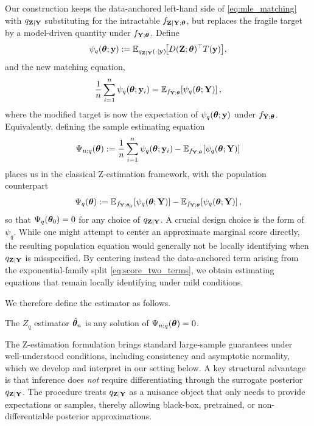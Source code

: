 \documentclass[twoside,11pt]{article}
\begin{document}
Our construction keeps the data-anchored left-hand side of \eqref{eq:mle_matching} with
$q_{{\bf Z}\mid{\bf Y}}$ substituting for the intractable $f_{{\bf Z}\mid{\bf Y};{\bm{\theta}}}$, but replaces the fragile target by a model-driven quantity under $f_{{\bf Y};{\bm{\theta}}}$. Define
\begin{equation}
\psi_q({\bm{\theta}};{\bf y})
:=
\mathbb{E}_{q_{{\bf Z}\mid{\bf Y}}(\cdot\mid {\bf y})}\!\big[D({\bf Z};{\bm{\theta}})^\top T({\bf y})\big]
\label{eq:psi_q},
\end{equation}
%
and the new matching equation, 
%
\begin{equation}
\frac{1}{n}\sum_{i=1}^n \psi_q({\bm{\theta}};{\bf y}_i)
=
\mathbb{E}_{f_{{\bf Y};{\bm{\theta}}}}\!\left[\psi_q({\bm{\theta}};{\bf Y})\right],
\label{eq:zq_matching}
\end{equation}
%
where the modified target is now the expectation of $\psi_q({\bm{\theta}};{\bf y})$ under $f_{{\bf Y};{\bm{\theta}}}$. Equivalently, defining the sample estimating equation
%
\begin{equation}
\Psi_{n;q}({\bm{\theta}})
:=
\frac{1}{n}\sum_{i=1}^n \psi_q({\bm{\theta}};{\bf y}_i)
-
\mathbb{E}_{f_{{\bf Y};{\bm{\theta}}}}\!\left[\psi_q({\bm{\theta}};{\bf Y})\right]
\label{eq:Psi_nq}
\end{equation}
places us in the classical Z-estimation framework, with the population counterpart
\[
\Psi_q({\bm{\theta}})
:=
\mathbb E_{f_{{\bf Y};{\bm{\theta}}_0}}\!\left[\psi_q({\bm{\theta}};{\bf Y})\right]
-
\mathbb E_{f_{{\bf Y};{\bm{\theta}}}}\!\left[\psi_q({\bm{\theta}};{\bf Y})\right],
\]
so that $\Psi_q({\bm{\theta}}_0)=0$ for any choice of $q_{{\bf Z}\mid{\bf Y}}$. A crucial design choice is the form of $\psi_q$. While one might attempt to center an approximate marginal score directly, the resulting population equation would generally not be locally identifying when $q_{{\bf Z}\mid{\bf Y}}$ is misspecified.
By centering instead the data-anchored term arising from the exponential-family split \eqref{eq:score_two_terms}, we obtain estimating equations that remain locally identifying under mild conditions.

We therefore define the estimator
as follows.

\begin{definition}[$Z_q$ estimator]
\label{def:Zq}
The $Z_q$ estimator $\hat{{\bm{\theta}}}_n$ is any solution of $\Psi_{n;q}({\bm{\theta}})=0$.
\end{definition}

The Z-estimation formulation brings standard large-sample guarantees under well-understood conditions, including consistency and asymptotic normality, which we develop and interpret in our setting below.
A key structural advantage is that inference does \emph{not} require differentiating through the surrogate posterior $q_{{\bf Z}\mid{\bf Y}}$. The procedure treats $q_{{\bf Z}\mid{\bf Y}}$ as a nuisance object that only needs to provide expectations or samples, thereby allowing black-box, pretrained, or non-differentiable posterior approximations.
\end{document}
